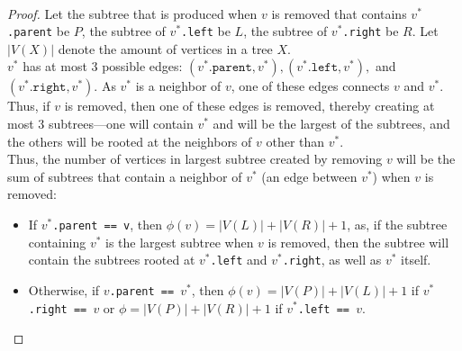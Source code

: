 \documentclass[11pt]{scrartcl}
\theoremstyle{dotlessP}
\theoremstyle{dotlessN}
\begin{document}
\begin{ans}
	 \
	\begin{proof}
		Let the subtree that is produced when $v$ is removed that contains \texttt{$v^*$.parent} be $P$, the subtree of \texttt{$v^*$.left} be $L$, the subtree of \texttt{$v^*$.right} be $R$. Let $|V(X)|$ denote the amount of vertices in a tree  $X$.
		\\

		$v^*$ has at most 3 possible edges: $(\texttt{$v^*$.parent}, \texttt{$v^*$}), (\texttt{$v^*$.left}, \texttt{$v^*$}),$ and $(\texttt{$v^*$.right}, \texttt{$v^*$})$. As $v^*$ is a neighbor of $v$, one of these edges connects $v$ and $v^*$. Thus, if $v$ is removed, then one of these edges is removed, thereby creating at most 3 subtrees---one will contain $v^*$ and will be the largest of the subtrees, and the others will be rooted at the neighbors of $v$ other than $v^*$. 
\\

		Thus, the number of vertices in largest subtree created by removing $v$ will be the sum of subtrees that contain a neighbor of $v^*$ (an edge between $v^*$) when $v$ is removed:
		\begin{itemize}
			\item If \texttt{$v^*$.parent == v}, then $\phi(v) = |V(L)| + |V(R)| + 1$, as, if the subtree containing  $v^*$ is the largest subtree when $v$ is removed, then the subtree will contain the subtrees rooted at \texttt{$v^*$.left} and \texttt{$v^*$.right}, as well as $v^*$ itself. 
			\item Otherwise, if \texttt{$v$.parent == $v^*$}, then $\phi(v) = |V(P)| + |V(L)| + 1$ if \texttt{$v^*$.right ==  $v$} or $\phi = |V(P)| + |V(R)| + 1$ if \texttt{$v^*$.left == $v$}.
		\end{itemize}


\end{proof}
\end{ans}
\end{document}
